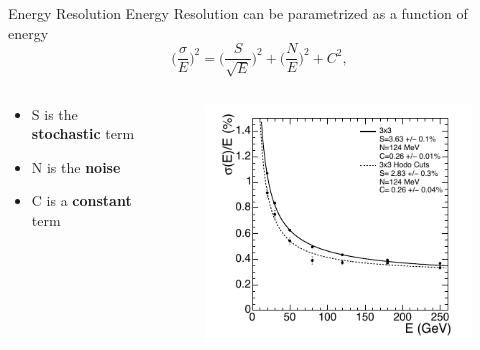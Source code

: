 \documentclass[10pt]{beamer}
\begin{document}
\begin{frame}{Energy Resolution}
    Energy Resolution can be parametrized as a function of energy
    \begin{equation}
        \biggl(\frac{\sigma}{E}\biggr)^2 = \biggl(\frac{S}{\sqrt{E}}\biggr)^2 + \biggl(\frac{N}{E}\biggr)^2 + C^2 ,
    \end{equation}
  
    \begin{columns}
        \begin{column}[]{0.45\textwidth}
        \begin{itemize}
            \item S is the \textbf{stochastic} term
            \item N is the \textbf{noise}
            \item C is a \textbf{constant} term
        \end{itemize}
        \end{column}
        \begin{column}[]{0.45\textwidth}
            \begin{figure}
            \includegraphics[width=\textwidth]{./img/res_energy.png}
            \end{figure}
        \end{column}
    \end{columns}
    
\end{frame}
\end{document}
